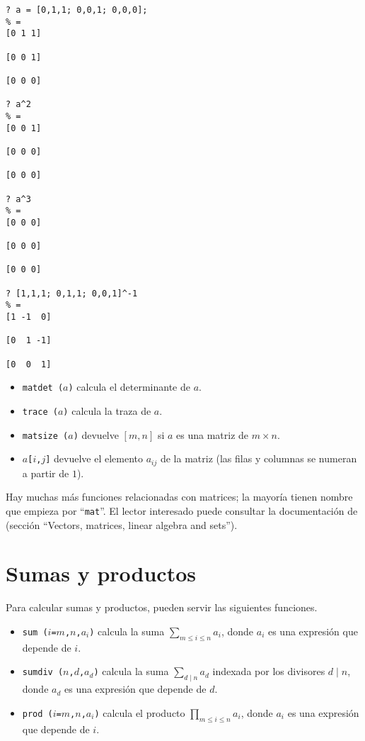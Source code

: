 \begin{framed}\footnotesize
\begin{verbatim}
? a = [0,1,1; 0,0,1; 0,0,0];
% = 
[0 1 1]

[0 0 1]

[0 0 0]

? a^2
% = 
[0 0 1]

[0 0 0]

[0 0 0]

? a^3
% = 
[0 0 0]

[0 0 0]

[0 0 0]

? [1,1,1; 0,1,1; 0,0,1]^-1
% = 
[1 -1  0]

[0  1 -1]

[0  0  1]
\end{verbatim}
\end{framed}

\begin{itemize}
\item \texttt{matdet\,($a$)} calcula el determinante de $a$.

\item \texttt{trace\,($a$)} calcula la traza de $a$.

\item \texttt{matsize\,($a$)} devuelve $[m,n]$ si $a$ es una matriz de
  $m\times n$.

\item \texttt{$a$[$i$,$j$]} devuelve el elemento $a_{ij}$ de la matriz
  (las filas y columnas se numeran a partir de $1$).
\end{itemize}

Hay muchas más funciones relacionadas con matrices; la mayoría tienen nombre que
empieza por ``\texttt{mat}''. El lector interesado puede consultar
la documentación de \gp{} (sección ``Vectors, matrices, linear algebra and
sets'').


\section{Sumas y productos}

Para calcular sumas y productos, pueden servir las siguientes funciones.

\begin{itemize}
\item \texttt{sum\,($i$=$m$,$n$,$a_i$)} calcula la suma
  $\sum\limits_{m \le i \le n} a_i$, donde $a_i$ es una expresión que depende de
  $i$.

\item \texttt{sumdiv\,($n$,$d$,$a_d$)} calcula la suma
  $\sum\limits_{d \mid n} a_d$ indexada por los divisores $d \mid n$, donde
  $a_d$ es una expresión que depende de $d$.

\item \texttt{prod\,($i$=$m$,$n$,$a_i$)} calcula el producto
  $\prod\limits_{m \le i \le n} a_i$, donde $a_i$ es una expresión que depende
  de $i$.
\end{itemize}


